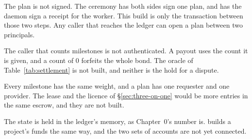 \begin{pdboundary}
\setlength{\parskip}{4pt plus 1pt}
The plan is not signed. The ceremony has both sides sign one plan, and has
the daemon sign a receipt for the worker. This build is only the
transaction between those two steps. Any caller that reaches the ledger
can open a plan between two principals.

The caller that counts milestones is not authenticated. A payout uses the
count it is given, and a count of 0 forfeits the whole bond. The oracle of
Table~\ref{tab:settlement} is not built, and neither is the hold for a
dispute.

Every milestone has the same weight, and a plan has one requester and one
provider. The lease and the licence of \S\ref{sec:three-on-one} would be
more entries in the same escrow, and they are not built.

The state is held in the ledger's memory, as Chapter~0's number is.
 builds a project's funds the same
way, and the two sets of accounts are not yet connected.
\end{pdboundary}
